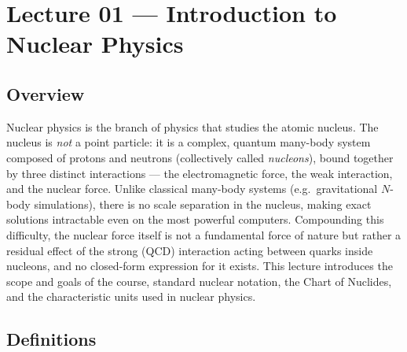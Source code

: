 
\section{Lecture 01 — Introduction to Nuclear Physics}
\label{sec:lec01}
\date{24 March 2026}


\subsection*{Overview}

Nuclear physics is the branch of physics that studies the atomic nucleus.
The nucleus is \emph{not} a point particle: it is a complex, quantum
many-body system composed of protons and neutrons (collectively called
\emph{nucleons}), bound together by three distinct interactions —
the electromagnetic force, the weak interaction, and the nuclear force.
Unlike classical many-body systems (e.g.\ gravitational $N$-body
simulations), there is no scale separation in the nucleus, making exact
solutions intractable even on the most powerful computers.
Compounding this difficulty, the nuclear force itself is not a
fundamental force of nature but rather a residual effect of the strong
(QCD) interaction acting between quarks inside nucleons, and no
closed-form expression for it exists.
This lecture introduces the scope and goals of the course, standard
nuclear notation, the Chart of Nuclides, and the characteristic units
used in nuclear physics.


\subsection*{Definitions}


